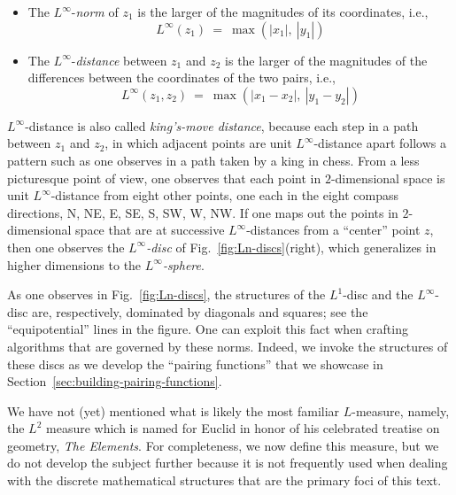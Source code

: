 \begin{itemize}
\item
The $L^\infty$-{\it norm} of $z_1$ is the larger of the magnitudes of its coordinates, i.e.,
\[ L^\infty(z_1) \ = \ \max(|x_1|, \ |y_1|)  \]  

\medskip\item
The $L^\infty$-{\it distance} between $z_1$ and $z_2$ is the larger of the magnitudes of the
differences between the coordinates of the two pairs, i.e.,
\[ L^\infty(z_1, z_2) \ = \ \max(|x_1 - x_2|, \  |y_1 - y_2|) \]
\end{itemize}
$L^\infty$-distance is also called {\it king's-move distance}, because each step in a path between $z_1$ and $z_2$, in which adjacent points are unit $L^\infty$-distance apart follows a pattern such as one observes in a path taken by a king in chess.  From a less picturesque point of view, one observes that each point in $2$-dimensional space is unit $L^\infty$-distance from eight other points, one each in the eight compass directions, N, NE, E, SE, S, SW, W, NW.  If one maps out the points in $2$-dimensional space that are at successive $L^\infty$-distances from a ``center'' point $z$, then one observes the {\it $L^\infty$-disc} of Fig.~\ref{fig:Ln-discs}(right), which generalizes in higher dimensions to the {\it $L^\infty$-sphere}.
  

\smallskip

As one observes in Fig.~\ref{fig:Ln-discs}, the structures of the $L^1$-disc and the $L^\infty$-disc are, respectively, dominated by diagonals and squares; see the ``equipotential'' lines in the figure.  One can exploit this fact when crafting algorithms that are governed by these norms.  Indeed, we invoke the structures of these discs as we develop the ``pairing functions'' that we showcase in Section~\ref{sec:building-pairing-functions}.

\bigskip


We have not (yet) mentioned what is likely the most familiar $L$-measure, namely, the $L^2$ measure which is named for Euclid in honor of his celebrated treatise on geometry, {\it The Elements}.  For completeness, we now define this measure, but we do not develop the subject further because it is not frequently used when dealing with the discrete mathematical structures
that are the primary foci of this text.

